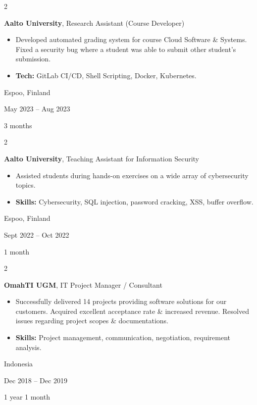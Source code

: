 \documentclass[10pt, a4paper]{article}
\newenvironment{highlights}{
    \begin{itemize}[
        topsep=0.10 cm,
        parsep=0.10 cm,
        partopsep=0pt,
        itemsep=0pt,
        leftmargin=0 cm + 10pt
    ]
}{
    \end{itemize}
} %
\newenvironment{twocolentry}[2][]{
    \onecolentry
    \def\secondColumn{#2}
    \setcolumnwidth{\fill, 3 cm}
    \begin{paracol}{2}
}{
    \switchcolumn \raggedleft \secondColumn
    \end{paracol}
    \endonecolentry
} %
\begin{document}
        \begin{twocolentry}{
            Espoo, Finland

        May 2023 – Aug 2023

        3 months
        }
            \textbf{Aalto University}, Research Assistant (Course Developer)
            \begin{highlights}
                \item Developed automated grading system for course Cloud Software \& Systems. Fixed a security bug where a student was able to submit other student's submission.
                \item \textbf{Tech:} GitLab CI/CD, Shell Scripting, Docker, Kubernetes.
            \end{highlights}
        \end{twocolentry}


        \vspace{0.2 cm}

        \begin{twocolentry}{
            Espoo, Finland

        Sept 2022 – Oct 2022

        1 month
        }
            \textbf{Aalto University}, Teaching Assistant for Information Security
            \begin{highlights}
                \item Assisted students during hands-on exercises on a wide array of cybersecurity topics.
                \item \textbf{Skills:} Cybersecurity, SQL injection, password cracking, XSS, buffer overflow.
            \end{highlights}
        \end{twocolentry}


        \vspace{0.2 cm}

        \begin{twocolentry}{
            Indonesia

        Dec 2018 – Dec 2019

        1 year 1 month
        }
            \textbf{OmahTI UGM}, IT Project Manager / Consultant
            \begin{highlights}
                \item Successfully delivered 14 projects providing software solutions for our customers. Acquired excellent acceptance rate \& increased revenue. Resolved issues regarding project scopes \& documentations.
                \item \textbf{Skills:} Project management, communication, negotiation, requirement analysis.
            \end{highlights}
        \end{twocolentry}
\end{document}
